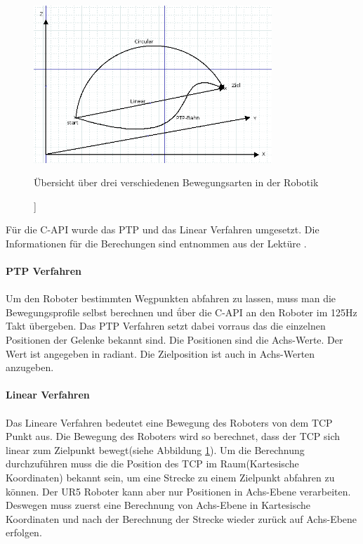 \begin{figure}[H]
  \centering
    \includegraphics[width=0.8\textwidth]{pic/bewegungsarten.png}
      \caption[Bewegungsarten in Robotik]]{Übersicht über drei verschiedenen Bewegungsarten in der Robotik}
      \label{fig:bewegungsarten}
\end{figure}

Für die C-\ac{API} wurde das \ac{PTP} und das Linear Verfahren umgesetzt. Die Informationen für die Berechungen sind entnommen aus der Lektüre \cite{WW-2013}.
\\\\
\textbf{\acs{PTP} Verfahren}
\\\\
Um den Roboter bestimmten Wegpunkten abfahren zu lassen, muss man die Bewegungsprofile selbst berechnen und ǘber die C-API an den Roboter im 125Hz Takt übergeben. Das \ac{PTP} Verfahren setzt dabei vorraus das die einzelnen Positionen der Gelenke bekannt sind. Die Positionen sind die Achs-Werte. Der Wert ist angegeben in radiant. Die Zielposition ist auch in Achs-Werten anzugeben.
\\\\
\textbf{Linear Verfahren}
\\\\
Das Lineare Verfahren bedeutet eine Bewegung des Roboters von dem \ac{TCP} Punkt aus. Die Bewegung des Roboters wird so berechnet, dass der \ac{TCP} sich linear zum Zielpunkt bewegt(siehe Abbildung \ref{fig:bewegungsarten}).
Um die Berechnung durchzuführen muss die die Position des \ac{TCP} im Raum(Kartesische Koordinaten) bekannt sein, um eine Strecke zu einem Zielpunkt abfahren zu können. Der UR5 Roboter kann aber nur Positionen in Achs-Ebene verarbeiten. Deswegen muss zuerst eine Berechnung von Achs-Ebene in Kartesische Koordinaten und nach der Berechnung der Strecke wieder zurück auf Achs-Ebene erfolgen.

